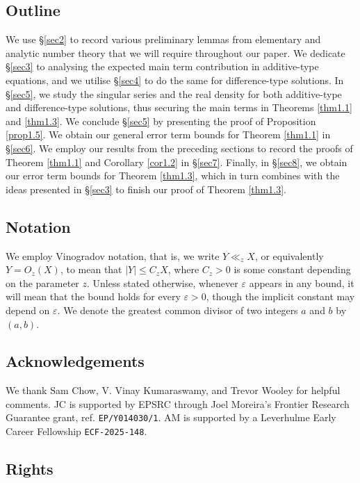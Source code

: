 \documentclass[12pt,reqno]{amsart}
\theoremstyle{definition}
\theoremstyle{remark}
\numberwithin{equation}{section}
\renewcommand{\leq}{\leqslant}
\def\eps{\varepsilon}
\newcommand\1{\mathds{1}}
\begin{document}
\subsection*{Outline} We use \S\ref{sec2} to record various preliminary lemmas from elementary and analytic number theory that we will require throughout our paper. We dedicate \S\ref{sec3} to analysing the expected main term contribution in additive-type equations, and we utilise \S\ref{sec4} to do the same for difference-type solutions. In \S\ref{sec5}, we study the singular series and the real density for both additive-type and difference-type solutions, thus securing the main terms in Theorems \ref{thm1.1} and \ref{thm1.3}. We conclude \S\ref{sec5} by presenting the proof of Proposition \ref{prop1.5}. We obtain our general error term bounds for Theorem \ref{thm1.1} in \S\ref{sec6}. We employ our results from the preceding sections to record the proofs of Theorem \ref{thm1.1} and Corollary \ref{cor1.2} in \S\ref{sec7}. Finally, in \S\ref{sec8}, we obtain our error term bounds for Theorem \ref{thm1.3}, which in turn combines with the ideas presented in \S\ref{sec3} to finish our proof of Theorem \ref{thm1.3}.


\subsection*{Notation} We employ Vinogradov notation, that is, we write $Y \ll_{z} X$, or equivalently $Y =O_z(X)$, to mean that $|Y| \leq C_z X$, where $C_z>0$ is some constant depending on the parameter $z$. Unless stated otherwise, whenever $\eps$ appears in any bound, it will mean that the bound holds for every $\eps >0$, though the implicit constant may depend on $\eps$. We denote the greatest common divisor of two integers $a$ and $b$ by $(a,b)$.  

\subsection*{Acknowledgements} We thank Sam Chow, V. Vinay Kumaraswamy, and Trevor Wooley for helpful comments. JC is supported by EPSRC through Joel Moreira's Frontier Research Guarantee grant, ref. \texttt{EP/Y014030/1}. AM is supported by a Leverhulme Early Career Fellowship \texttt{ECF-2025-148}.


\subsection*{Rights}
\end{document}

